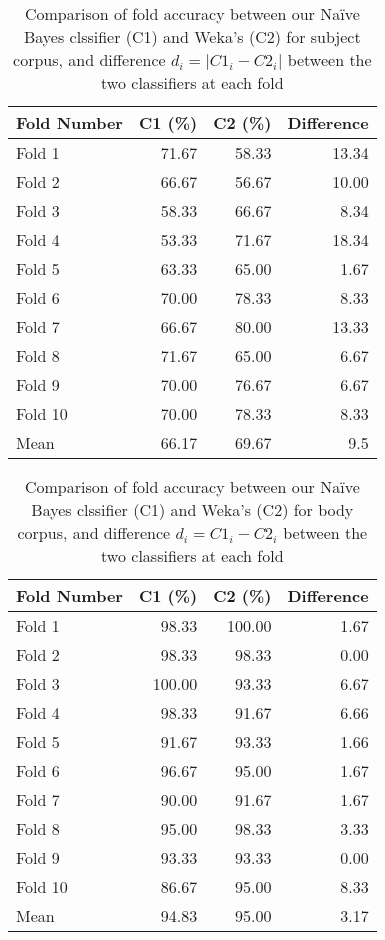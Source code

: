 \documentclass[10pt, a4paper]{article}
\begin{document}
\begin{table}[H]
\centering
\caption{Comparison of fold accuracy between our Na\"ive Bayes clssifier (C1) and Weka's (C2) for subject corpus, and difference $d_{i} = | C1_{i} - C2_{i} |$ between the two classifiers at each fold}
\begin{tabular}{@{}lrrr@{}}
\toprule
\textbf{Fold Number} & \textbf{C1 (\%)} & \textbf{C2 (\%)}
	& \textbf{Difference} \\
\midrule
Fold 1 & 71.67 & 58.33 & 13.34 \\
Fold 2 & 66.67 & 56.67 & 10.00 \\
Fold 3 & 58.33 & 66.67 & 8.34 \\
Fold 4 & 53.33 & 71.67 & 18.34 \\
Fold 5 & 63.33 & 65.00 & 1.67 \\
Fold 6 & 70.00 & 78.33 & 8.33 \\
Fold 7 & 66.67 & 80.00 & 13.33 \\
Fold 8 & 71.67 & 65.00 & 6.67 \\
Fold 9 & 70.00 & 76.67 & 6.67 \\
Fold 10 & 70.00 & 78.33 & 8.33 \\
\bottomrule
Mean & 66.17 & 69.67 & 9.5 \\
\bottomrule
\end{tabular}
\label{table:diffsubj}
\end{table}

\begin{table}[H]
\centering
\caption{Comparison of fold accuracy between our Na\"ive Bayes clssifier (C1) and Weka's (C2) for body corpus, and difference $d_{i} = C1_{i} - C2_{i}$ between the two classifiers at each fold}
\begin{tabular}{@{}lrrr@{}}
\toprule
\textbf{Fold Number} & \textbf{C1 (\%)} & \textbf{C2 (\%)}
	& \textbf{Difference} \\
\midrule
Fold 1 & 98.33 & 100.00 & 1.67 \\
Fold 2 & 98.33 & 98.33 & 0.00 \\
Fold 3 & 100.00 & 93.33 & 6.67 \\
Fold 4 & 98.33 & 91.67 & 6.66 \\
Fold 5 & 91.67 & 93.33 & 1.66 \\
Fold 6 & 96.67 & 95.00 & 1.67 \\
Fold 7 & 90.00 & 91.67 & 1.67 \\
Fold 8 & 95.00 & 98.33 & 3.33 \\
Fold 9 & 93.33 & 93.33 & 0.00 \\
Fold 10 & 86.67 & 95.00 & 8.33 \\
\bottomrule
Mean & 94.83 & 95.00 & 3.17 \\
\bottomrule
\end{tabular}
\label{table:diffbody}
\end{table}
\end{document}
